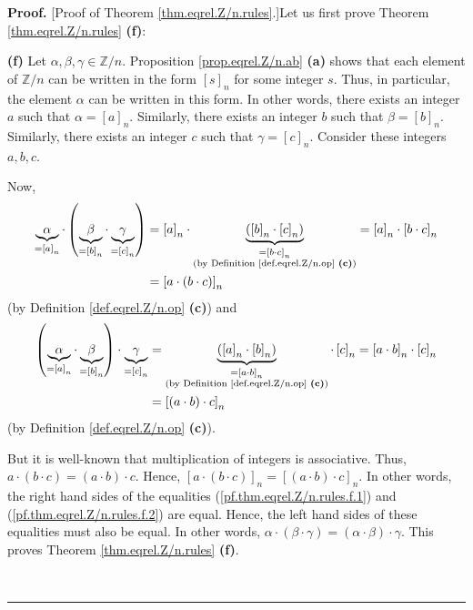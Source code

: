 \documentclass[numbers=enddot,12pt,final,onecolumn,notitlepage]{scrartcl}%
\numberwithin{exer}{subsection}
\theoremstyle{definition}
\newenvironment{proof}[1][Proof]{\noindent\textbf{#1.} }{\ \rule{0.5em}{0.5em}}
\begin{document}
\begin{proof}
[Proof of Theorem \ref{thm.eqrel.Z/n.rules}.]Let us first prove Theorem
\ref{thm.eqrel.Z/n.rules} \textbf{(f)}:

\textbf{(f)} Let $\alpha,\beta,\gamma\in\mathbb{Z}/n$. Proposition
\ref{prop.eqrel.Z/n.ab} \textbf{(a)} shows that each element of $\mathbb{Z}/n$
can be written in the form $\left[  s\right]  _{n}$ for some integer $s$.
Thus, in particular, the element $\alpha$ can be written in this form. In
other words, there exists an integer $a$ such that $\alpha=\left[  a\right]
_{n}$. Similarly, there exists an integer $b$ such that $\beta=\left[
b\right]  _{n}$. Similarly, there exists an integer $c$ such that
$\gamma=\left[  c\right]  _{n}$. Consider these integers $a,b,c$.

Now,%
\begin{align}
\underbrace{\alpha}_{=\left[  a\right]  _{n}}\cdot\left(  \underbrace{\beta
}_{=\left[  b\right]  _{n}}\cdot\underbrace{\gamma}_{=\left[  c\right]  _{n}%
}\right)   &  =\left[  a\right]  _{n}\cdot\underbrace{\left(  \left[
b\right]  _{n}\cdot\left[  c\right]  _{n}\right)  }_{\substack{=\left[  b\cdot
c\right]  _{n}\\\text{(by Definition \ref{def.eqrel.Z/n.op} \textbf{(c)})}%
}}=\left[  a\right]  _{n}\cdot\left[  b\cdot c\right]  _{n}\nonumber\\
&  =\left[  a\cdot\left(  b\cdot c\right)  \right]  _{n}
\label{pf.thm.eqrel.Z/n.rules.f.1}%
\end{align}
(by Definition \ref{def.eqrel.Z/n.op} \textbf{(c)}) and%
\begin{align}
\left(  \underbrace{\alpha}_{=\left[  a\right]  _{n}}\cdot\underbrace{\beta
}_{=\left[  b\right]  _{n}}\right)  \cdot\underbrace{\gamma}_{=\left[
c\right]  _{n}}  &  =\underbrace{\left(  \left[  a\right]  _{n}\cdot\left[
b\right]  _{n}\right)  }_{\substack{=\left[  a\cdot b\right]  _{n}\\\text{(by
Definition \ref{def.eqrel.Z/n.op} \textbf{(c)})}}}\cdot\left[  c\right]
_{n}=\left[  a\cdot b\right]  _{n}\cdot\left[  c\right]  _{n}\nonumber\\
&  =\left[  \left(  a\cdot b\right)  \cdot c\right]  _{n}
\label{pf.thm.eqrel.Z/n.rules.f.2}%
\end{align}
(by Definition \ref{def.eqrel.Z/n.op} \textbf{(c)}).

But it is well-known that multiplication of integers is associative. Thus,
$a\cdot\left(  b\cdot c\right)  =\left(  a\cdot b\right)  \cdot c$. Hence,
$\left[  a\cdot\left(  b\cdot c\right)  \right]  _{n}=\left[  \left(  a\cdot
b\right)  \cdot c\right]  _{n}$. In other words, the right hand sides of the
equalities (\ref{pf.thm.eqrel.Z/n.rules.f.1}) and
(\ref{pf.thm.eqrel.Z/n.rules.f.2}) are equal. Hence, the left hand sides of
these equalities must also be equal. In other words, $\alpha\cdot\left(
\beta\cdot\gamma\right)  =\left(  \alpha\cdot\beta\right)  \cdot\gamma$. This
proves Theorem \ref{thm.eqrel.Z/n.rules} \textbf{(f)}.


\end{proof}
\end{document}
